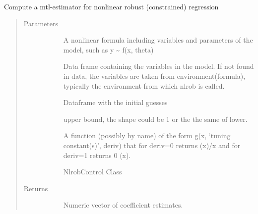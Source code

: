 \documentclass[letterpaper,10pt,english]{sphinxmanual}
\begin{document}
\begin{fulllineitems}
\label{\detokenize{_modules/nlrob:nlrob.nlrob_mtl}}
Compute a mtl-estimator for nonlinear robust (constrained) regression
\begin{quote}\begin{description}
\item[{Parameters}] \leavevmode\begin{description}
\item[{}] \leavevmode
A nonlinear formula including variables and parameters of the model,
such as y \textasciitilde{} f(x, theta)

\item[{}] \leavevmode
Data frame containing the variables in the model. If not found in
data, the variables are taken from environment(formula), typically
the environment from which nlrob is called.

\item[{}] \leavevmode
Dataframe with the initial guesses

\item[{}] \leavevmode
upper bound, the shape could be 1 or the the same of lower.

\item[{}] \leavevmode
A function (possibly by name) of the form g(x, ‘tuning constant(s)’,
deriv)
that for deriv=0 returns (x)/x and for deriv=1 returns  0 (x).

\item[{}] \leavevmode
\item[{}] \leavevmode
NlrobControl Class

\end{description}

\item[{Returns}] \leavevmode\begin{description}
\item[{}] \leavevmode
Numeric vector of coefficient estimates.


\end{description}
\end{description}
\end{quote}
\end{fulllineitems}
\end{document}
